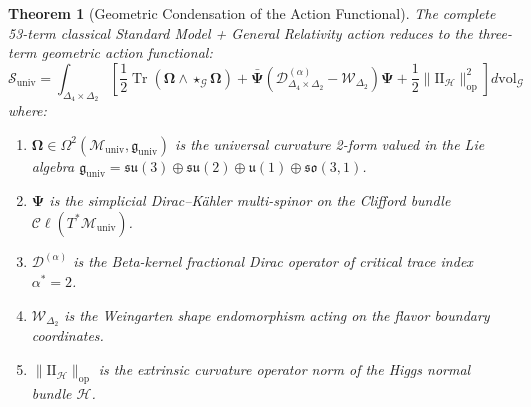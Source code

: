 \documentclass[11pt,reqno]{amsart}
\newtheorem{theorem}{Theorem}[section]
\theoremstyle{definition}
\begin{document}
\begin{theorem}[Geometric Condensation of the Action Functional]\label{thm:master_action_formal}
The complete 53-term classical Standard Model + General Relativity action reduces to the three-term geometric action functional:
\begin{equation}
\boxed{
\mathcal{S}_{\mathrm{univ}} = \int_{\Delta_4 \times \Delta_2} \left[ \frac{1}{2} \operatorname{Tr}\left( \boldsymbol{\Omega} \wedge \star_{\mathcal{G}} \boldsymbol{\Omega} \right) + \bar{\boldsymbol{\Psi}} \left( \boldsymbol{\mathcal{D}}_{\Delta_4 \times \Delta_2}^{(\alpha)} - \boldsymbol{\mathcal{W}}_{\Delta_2} \right) \boldsymbol{\Psi} + \frac{1}{2} \|\mathrm{I\!I}_{\mathcal{H}}\|_{\mathrm{op}}^2 \right] d\mathrm{vol}_{\mathcal{G}}
}
\end{equation}
where:
\begin{enumerate}
    \item $\boldsymbol{\Omega} \in \Omega^2(\mathcal{M}_{\mathrm{univ}}, \mathfrak{g}_{\mathrm{univ}})$ is the universal curvature 2-form valued in the Lie algebra $\mathfrak{g}_{\mathrm{univ}} = \mathfrak{su}(3) \oplus \mathfrak{su}(2) \oplus \mathfrak{u}(1) \oplus \mathfrak{so}(3,1)$.
    \item $\boldsymbol{\Psi}$ is the simplicial Dirac--Kähler multi-spinor on the Clifford bundle $\mathcal{C}\ell(T^*\mathcal{M}_{\mathrm{univ}})$.
    \item $\boldsymbol{\mathcal{D}}^{(\alpha)}$ is the Beta-kernel fractional Dirac operator of critical trace index $\alpha^* = 2$.
    \item $\boldsymbol{\mathcal{W}}_{\Delta_2}$ is the Weingarten shape endomorphism acting on the flavor boundary coordinates.
    \item $\|\mathrm{I\!I}_{\mathcal{H}}\|_{\mathrm{op}}$ is the extrinsic curvature operator norm of the Higgs normal bundle $\mathcal{H}$.
\end{enumerate}
\end{theorem}
\end{document}
